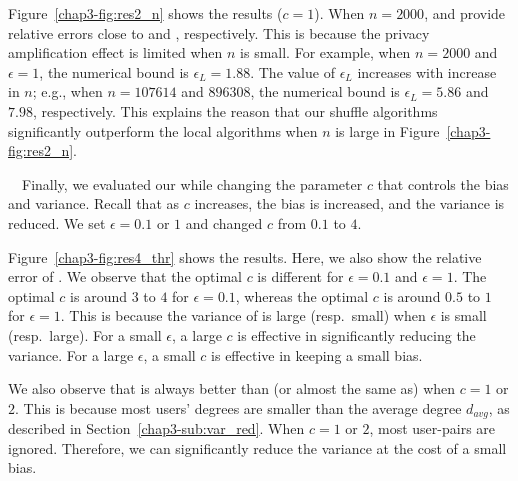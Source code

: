 Figure~\ref{chap3-fig:res2_n} shows the results ($c=1$). 
When $n=2000$, \AlgWSTri{} and \AlgWSCyc{} provide 
relative errors close to \AlgWLTri{} and \AlgWLCyc{}, respectively. 
This is because the privacy amplification effect is limited when $n$ is small. 
For example, when $n=2000$ and $\epsilon=1$, 
the numerical bound is $\epsilon_L=1.88$. 
The value of $\epsilon_L$ increases with increase in $n$; e.g., when $n=107614$ and $896308$, the numerical bound is $\epsilon_L= 5.86$ and $7.98$, respectively. 
This explains the reason that our shuffle algorithms significantly outperform the local algorithms when $n$ is large in Figure~\ref{chap3-fig:res2_n}. 




\smallskip
{}~~Finally, we evaluated our \AlgWSTriVR{} while changing the parameter $c$ that controls the bias and variance. 
Recall that as $c$ increases, the bias is increased, and the variance is reduced. 
We set $\epsilon=0.1$ or $1$ and changed $c$ from $0.1$ to $4$. 

Figure~\ref{chap3-fig:res4_thr} shows the results. 
Here, we also show the relative error of \AlgWSTri{}. 
We observe that the optimal $c$ is different for $\epsilon=0.1$ and $\epsilon=1$. The optimal $c$ is around $3$ to $4$ for $\epsilon=0.1$, whereas the optimal $c$ is around $0.5$ to $1$ for $\epsilon=1$. 
This is because the variance of \AlgWSTri{} is large (resp.~small) when $\epsilon$ is small (resp.~large). 
For a small $\epsilon$, a large $c$ is effective in significantly reducing the variance. 
For a large $\epsilon$, a small $c$ is effective in keeping a small bias. 

We also observe that \AlgWSTriVR{} is always better than (or almost the same as) \AlgWSTri{} when $c=1$ or $2$. 
This is because most users' degrees are smaller than the average degree $d_{avg}$, as described in Section~\ref{chap3-sub:var_red}. 
When $c=1$ or $2$, most user-pairs are ignored. 
Therefore, we can significantly reduce the variance at the cost of a small bias. 

